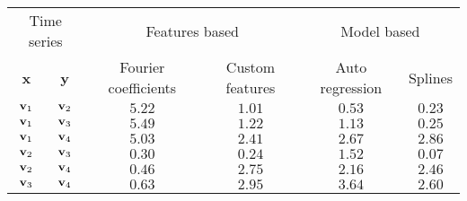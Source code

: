 \begin{tabular}{cccccc}
    \toprule
    \multicolumn{2}{c}{Time series} & \multicolumn{2}{c}{Features based} & \multicolumn{2}{c}{Model based} \\
    \textbf{x} & \textbf{y} & Fourier coefficients & Custom features & Auto regression & Splines \\ \otoprule
    $\textbf{v}_{1}$ & $\textbf{v}_{2}$ & $5.22$ & $1.01$ & $0.53$ & $0.23$ \\
    $\textbf{v}_{1}$ & $\textbf{v}_{3}$ & $5.49$ & $1.22$ & $1.13$ & $0.25$ \\
    $\textbf{v}_{1}$ & $\textbf{v}_{4}$ & $5.03$ & $2.41$ & $2.67$ & $2.86$ \\
    $\textbf{v}_{2}$ & $\textbf{v}_{3}$ & $0.30$ & $0.24$ & $1.52$ & $0.07$ \\
    $\textbf{v}_{2}$ & $\textbf{v}_{4}$ & $0.46$ & $2.75$ & $2.16$ & $2.46$ \\
    $\textbf{v}_{3}$ & $\textbf{v}_{4}$ & $0.63$ & $2.95$ & $3.64$ & $2.60$ \\
    \bottomrule
\end{tabular}
